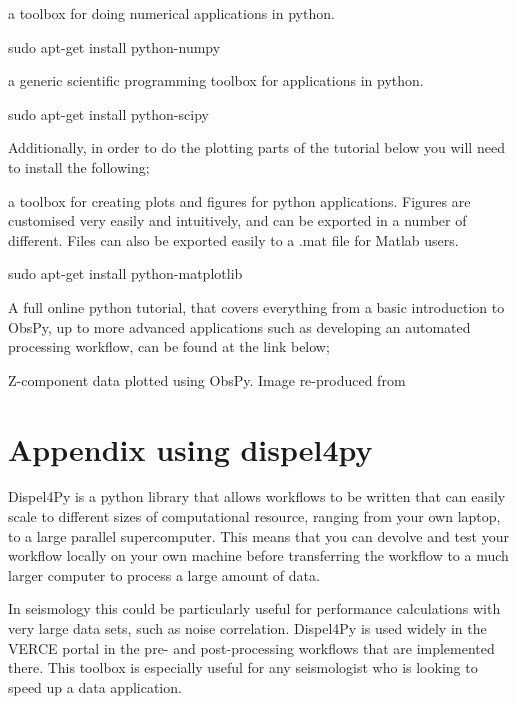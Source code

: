 \documentclass[english]{book}
\begin{document}
 \textendash{} a toolbox for doing numerical applications in python.

sudo apt-get install python-numpy

 \textendash{} a generic scientific programming toolbox for applications in
python.

sudo apt-get install python-scipy

Additionally, in order to do the plotting parts of the tutorial below
you will need to install the following;

 \textendash{} a toolbox for creating plots and figures for python
applications. Figures are customised very easily and intuitively, and
can be exported in a number of different. Files can also be exported
easily to a .mat file for Matlab users.

sudo apt-get install python-matplotlib


A full online python tutorial, that covers everything from a basic
introduction to ObsPy, up to more advanced applications such as
developing an automated processing workflow, can be found at the link
below;



 Z-component data plotted using ObsPy. Image
re-produced from



\chapter{Appendix \textendash{} using dispel4py}
\label{\detokenize{Appendix4::doc}}\label{\detokenize{Appendix4:appendix-4-using-dispel4py}}
Dispel4Py is a python library that allows workflows to be written that
can easily scale to different sizes of computational resource, ranging
from your own laptop, to a large parallel supercomputer. This means that
you can devolve and test your workflow locally on your own machine
before transferring the workflow to a much larger computer to process a
large amount of data.

In seismology this could be particularly useful for performance
calculations with very large data sets, such as noise correlation.
Dispel4Py is used widely in the VERCE portal in the pre- and
post-processing workflows that are implemented there. This toolbox is
especially useful for any seismologist who is looking to speed up a data
application.
\end{document}
